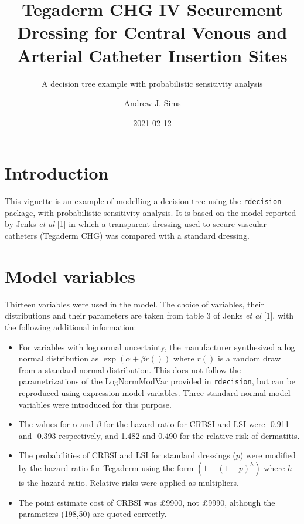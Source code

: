 \documentclass[
]{article}
\title{Tegaderm CHG IV Securement Dressing for Central Venous and
Arterial Catheter Insertion Sites}
\subtitle{A decision tree example with probabilistic sensitivity
analysis}
\author{Andrew J. Sims}
\date{2021-02-12}
\providecommand{\tightlist}{%
  \setlength{\itemsep}{0pt}\setlength{\parskip}{0pt}}
\begin{document}
\maketitle

\hypertarget{introduction}{%
\section{Introduction}\label{introduction}}

This vignette is an example of modelling a decision tree using the
\texttt{rdecision} package, with probabilistic sensitivity analysis. It
is based on the model reported by Jenks \emph{et al} {[}1{]} in which a
transparent dressing used to secure vascular catheters (Tegaderm CHG)
was compared with a standard dressing.

\hypertarget{model-variables}{%
\section{Model variables}\label{model-variables}}

Thirteen variables were used in the model. The choice of variables,
their distributions and their parameters are taken from table 3 of Jenks
\emph{et al} {[}1{]}, with the following additional information:

\begin{itemize}
\tightlist
\item
  For variables with lognormal uncertainty, the manufacturer synthesized
  a log normal distribution as \(\exp(\alpha + \beta r())\) where
  \(r()\) is a random draw from a standard normal distribution. This
  does not follow the parametrizations of the LogNormModVar provided in
  \texttt{rdecision}, but can be reproduced using expression model
  variables. Three standard normal model variables were introduced for
  this purpose.
\item
  The values for \(\alpha\) and \(\beta\) for the hazard ratio for CRBSI
  and LSI were -0.911 and -0.393 respectively, and 1.482 and 0.490 for
  the relative risk of dermatitis.
\item
  The probabilities of CRBSI and LSI for standard dressings (\(p\)) were
  modified by the hazard ratio for Tegaderm using the form
  \((1-(1-p)^h)\) where \(h\) is the hazard ratio. Relative risks were
  applied as multipliers.
\item
  The point estimate cost of CRBSI was £9900, not £9990, although the
  parameters (198,50) are quoted correctly.
\end{itemize}
\end{document}
